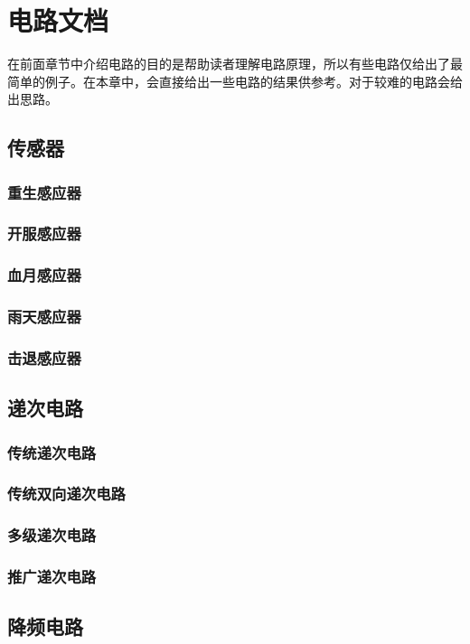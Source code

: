 \chapter{电路文档}

在前面章节中介绍电路的目的是帮助读者理解电路原理，所以有些电路仅给出了最简单的例子。在本章中，会直接给出一些电路的结果供参考。对于较难的电路会给出思路。

\section{传感器}
\subsection{重生感应器}
\subsection{开服感应器}
\subsection{血月感应器}
\subsection{雨天感应器}
\subsection{击退感应器}

\section{递次电路}
\subsection{传统递次电路}
\subsection{传统双向递次电路}
\subsection{多级递次电路}
\subsection{推广递次电路}

\section{降频电路}
